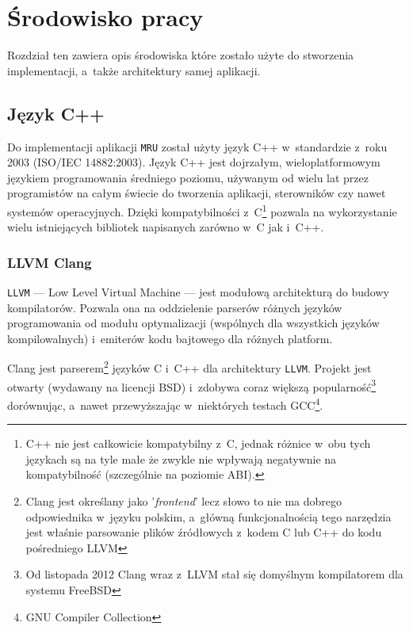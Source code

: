 \chapter{Środowisko pracy}
\label{srodowisko}
\par
Rozdział ten zawiera opis środowiska które zostało użyte do stworzenia implementacji, a~także architektury samej aplikacji.

\section{Język C++}
\par
Do implementacji aplikacji \texttt{MRU} został użyty język C++ w~standardzie z~roku 2003 (ISO/IEC 14882:2003).
Język C++ jest dojrzałym, wieloplatformowym językiem programowania średniego poziomu, używanym od wielu lat przez programistów na całym świecie do tworzenia aplikacji, sterowników czy nawet systemów operacyjnych. Dzięki kompatybilności z~C\footnote{C++ nie jest całkowicie kompatybilny z~C, jednak różnice w~obu tych językach są na tyle małe że zwykle nie wpływają negatywnie na kompatybilność (szczególnie na poziomie ABI).} pozwala na wykorzystanie wielu istniejących bibliotek napisanych zarówno w~C jak i~C++.

\subsection{LLVM Clang}
\par
\texttt{LLVM} --- Low Level Virtual Machine --- jest modułową architekturą do budowy kompilatorów. Pozwala ona na oddzielenie parserów różnych języków programowania od modułu optymalizacji (wspólnych dla wszystkich języków kompilowalnych) i~emiterów kodu bajtowego dla różnych platform.

\par
Clang jest parserem\footnote{Clang jest określany jako '\textit{frontend}' lecz słowo to nie ma dobrego odpowiednika w~języku polskim, a~główną funkcjonalnością tego narzędzia jest właśnie parsowanie plików źródłowych z~kodem C lub C++ do kodu pośredniego LLVM} języków C i~C++ dla architektury \texttt{LLVM}. Projekt jest otwarty (wydawany na licencji BSD) i~zdobywa coraz większą popularność\footnote{Od listopada 2012 Clang wraz z~LLVM stał się domyślnym kompilatorem dla systemu FreeBSD} dorównując, a~nawet przewyższając w~niektórych testach GCC\footnote{GNU Compiler Collection}.

